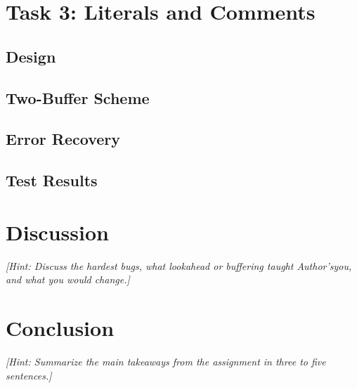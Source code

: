 \documentclass[manuscript,oneside,10pt]{acmart}
\newcommand{\hint}[1]{{\small\itshape [Hint: #1]}}
\begin{document}
\section{Task 3: Literals and Comments}

\subsection{Design}

\subsection{Two-Buffer Scheme}

\subsection{Error Recovery}

\subsection{Test Results}

\section{Discussion}
\hint{Discuss the hardest bugs, what lookahead or buffering taught
Author’syou, and what you would change.}

\section{Conclusion}
\hint{Summarize the main takeaways from the assignment in three to five sentences.}
\end{document}
